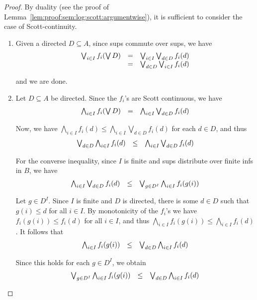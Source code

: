 \documentclass[%
  a4paper,
  UKenglish,
  cleveref,
  autoref,
  thm-restate,
  numberwithinsect,
]{lipics-v2021}
\newcommand\sle\subseteq
\begin{document}
\begin{proof}
By duality (see the proof of Lemma~\ref{lem:proof:sem:log:scott:argumentwise}),
it is sufficient to consider the case of Scott-continuity.
\begin{enumerate}[(1)]
\item
Given a directed $D \sle A$, since sups commute over sups, we have
\[
\begin{array}{r c l}
  \bigvee_{i \in I} f_i(\bigvee D)
& =
& \bigvee_{i \in I} \bigvee_{d \in D} f_i(d)
\\
%
& =
& \bigvee_{d \in D} \bigvee_{i \in I} f_i(d)
\end{array}
\]

\noindent
and we are done.

\item
Let $D \sle A$ be directed.
Since the $f_i$'s are Scott continuous, we have
\[
\begin{array}{l l l}
  \bigwedge_{i \in I} f_i(\bigvee D)
& =
& \bigwedge_{i \in I} \bigvee_{d \in D} f_i(d)
\end{array}
\]

Now, we have
\(
\bigwedge_{i \in I} f_i(d)
\leq
\bigwedge_{i \in I} \bigvee_{d \in D} f_i(d)
\)
for each $d \in D$, 
and thus
\[
\begin{array}{l l l}
  \bigvee_{d \in D} \bigwedge_{i \in I} f_i(d)
& \leq
& \bigwedge_{i \in I} \bigvee_{d \in D} f_i(d)
\end{array}
\]

For the converse inequality, since $I$ is finite
and sups distribute over finite infs in $B$, we have
\[
\begin{array}{l l l}
  \bigwedge_{i \in I} \bigvee_{d \in D} f_i(d)
& \leq
& \bigvee_{g \in D^I} \bigwedge_{i \in I} f_i(g(i))
\end{array}
\]

Let $g \in D^I$.
Since $I$ is finite and $D$ is directed,
there is some $d \in D$ such that
$g(i) \leq d$ for all $i \in I$.
By monotonicity of the $f_i$'s we have
$f_i(g(i)) \leq f_i(d)$ for all $i \in I$,
and thus
$\bigwedge_{i \in I} f_i(g(i)) \leq \bigwedge_{i \in I} f_i(d)$.
It follows that
\[
\begin{array}{l l l}
  \bigwedge_{i \in I} f_i(g(i))
& \leq
& \bigvee_{d \in D} \bigwedge_{i \in I} f_i(d)
\end{array}
\]

\noindent
Since this holds for each $g \in D^I$, we obtain
\[
\begin{array}{l l l}
  \bigvee_{g \in D^I} \bigwedge_{i \in I} f_i(g(i))
& \leq
& \bigvee_{d \in D} \bigwedge_{i \in I} f_i(d)
\end{array}
\]
\qedhere
\end{enumerate}
\end{proof}
\end{document}
